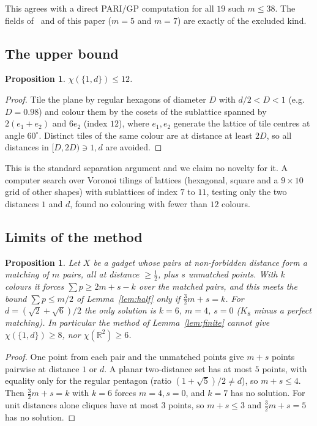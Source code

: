 \documentclass[11pt,a4paper]{amsart}
\newtheorem{proposition}[theorem]{Proposition}
\theoremstyle{remark}
\newcommand{\R}{\mathbb{R}}
\begin{document}
This agrees with a direct PARI/GP computation for all $19$ such $m\le38$. The fields of~\cite{DN25} and of this paper ($m=5$ and $m=7$) are exactly of the excluded kind.

\subsection{The upper bound}

\begin{proposition}\label{prop:upper}
$\chi(\{1,d\})\le12$.
\end{proposition}
\begin{proof}
Tile the plane by regular hexagons of diameter $D$ with $d/2<D<1$ (e.g.\ $D=0.98$) and colour them by the cosets of the sublattice spanned by $2(e_1+e_2)$ and $6e_2$ (index $12$), where $e_1,e_2$ generate the lattice of tile centres at angle $60^\circ$. Distinct tiles of the same colour are at distance at least $2D$, so all distances in $[D,2D)\ni1,d$ are avoided.
\end{proof}

This is the standard separation argument and we claim no novelty for it. A computer search over Voronoi tilings of lattices (hexagonal, square and a $9\times10$ grid of other shapes) with sublattices of index $7$ to $11$, testing only the two distances $1$ and $d$, found no colouring with fewer than $12$ colours.

\subsection{Limits of the method}

\begin{proposition}\label{prop:limits}
Let $X$ be a gadget whose pairs at non-forbidden distance form a matching of $m$ pairs, all at distance $\ge\tfrac12$, plus $s$ unmatched points. With $k$ colours it forces $\sum p\ge2m+s-k$ over the matched pairs, and this meets the bound $\sum p\le m/2$ of Lemma~\ref{lem:half} only if $\tfrac32m+s=k$. For $d=(\sqrt2+\sqrt6)/2$ the only solution is $k=6$, $m=4$, $s=0$ ($K_8$ minus a perfect matching). In particular the method of Lemma~\ref{lem:finite} cannot give $\chi(\{1,d\})\ge8$, nor $\chi(\R^2)\ge6$.
\end{proposition}
\begin{proof}
One point from each pair and the unmatched points give $m+s$ points pairwise at distance $1$ or $d$. A planar two-distance set has at most $5$ points, with equality only for the regular pentagon (ratio $(1+\sqrt5)/2\ne d$), so $m+s\le4$. Then $\tfrac32m+s=k$ with $k=6$ forces $m=4,s=0$, and $k=7$ has no solution. For unit distances alone cliques have at most $3$ points, so $m+s\le3$ and $\tfrac32m+s=5$ has no solution.
\end{proof}
\end{document}
